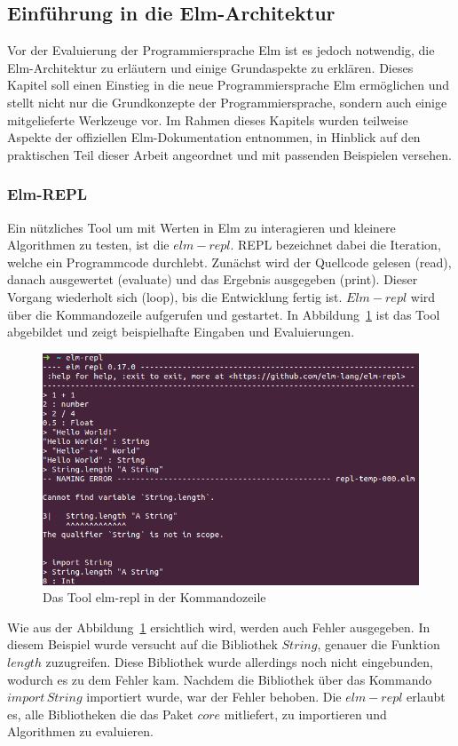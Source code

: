 \subsection{Einführung in die Elm-Architektur}
\label{sec:elm-architektur}
Vor der Evaluierung der Programmiersprache Elm ist es jedoch notwendig, die Elm-Architektur zu erläutern und einige Grundaspekte zu erklären. Dieses Kapitel soll einen Einstieg in die neue Programmiersprache Elm ermöglichen und stellt nicht nur die Grundkonzepte der Programmiersprache, sondern auch einige mitgelieferte Werkzeuge vor. Im Rahmen dieses Kapitels wurden teilweise Aspekte der offiziellen Elm-Dokumentation \cite[Vgl.]{elm-no-runtime-errors} entnommen, in Hinblick auf den praktischen Teil dieser Arbeit angeordnet und mit passenden Beispielen versehen.

\subsubsection{Elm-REPL}
\label{sec:elm-repl}
Ein nützliches Tool um mit Werten in Elm zu interagieren und kleinere Algorithmen zu testen, ist die $elm-repl$. \ac{REPL} bezeichnet dabei die Iteration, welche ein Programmcode durchlebt. Zunächst wird der Quellcode gelesen (read), danach ausgewertet (evaluate) und das Ergebnis ausgegeben (print). Dieser Vorgang wiederholt sich (loop), bis die Entwicklung fertig ist. $Elm-repl$ wird über die Kommandozeile aufgerufen und gestartet. In Abbildung~\ref{fig:elm-repl} ist das Tool abgebildet und zeigt beispielhafte Eingaben und Evaluierungen.
\begin{figure}[h]
\centering
\includegraphics[scale=0.5]{img/elm-repl.png}
\caption{Das Tool elm-repl in der Kommandozeile}\label{fig:elm-repl}
\end{figure}
Wie aus der Abbildung~\ref{fig:elm-repl} ersichtlich wird, werden auch Fehler ausgegeben. In diesem Beispiel wurde versucht auf die Bibliothek $String$, genauer die Funktion $length$ zuzugreifen. Diese Bibliothek wurde allerdings noch nicht eingebunden, wodurch es zu dem Fehler kam. Nachdem die Bibliothek über das Kommando $import\,String$ importiert wurde, war der Fehler behoben. Die $elm-repl$ erlaubt es, alle Bibliotheken die das Paket $core$ mitliefert, zu importieren und Algorithmen zu evaluieren.

